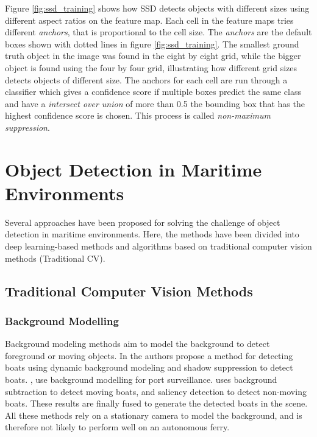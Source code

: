 Figure \ref{fig:ssd_training} shows how SSD detects objects with different sizes using different aspect ratios on the feature map. Each cell in the feature maps tries different \textit{anchors}, that is proportional to the cell size. The \textit{anchors} are the default boxes shown with dotted lines in figure \ref{fig:ssd_training}. The smallest ground truth object in the image was found in the eight by eight grid, while the bigger object is found using the four by four grid, illustrating how different grid sizes detects objects of different size. The anchors for each cell are run through a classifier which gives a confidence score if multiple boxes predict the same class and have a \textit{intersect over union} of more than 0.5 the bounding box that has the highest confidence score is chosen. This process is called \textit{non-maximum suppression}.


\section{Object Detection in Maritime Environments}
\label{sec:obj_det}

Several approaches have been proposed for solving the challenge of object detection in maritime environments. Here, the methods have been divided into deep learning-based methods and algorithms based on traditional computer vision methods (Traditional CV). 

\subsection{Traditional Computer Vision Methods}

\subsubsection{Background Modelling}
Background modeling methods aim to model the background to detect foreground or moving objects. In \citep{BackgroundWaveletSubstract} the authors propose a method for detecting boats using dynamic background modeling and shadow suppression to detect boats. \citep{SeeCoast}, \citep{Pires2010} use background modelling for port surveillance. \citep{Tran2016} uses background subtraction to detect moving boats, and saliency detection to detect non-moving boats. These results are finally fused to generate the detected boats in the scene. All these methods rely on a stationary camera to model the background, and is therefore not likely to perform well on an autonomous ferry.

